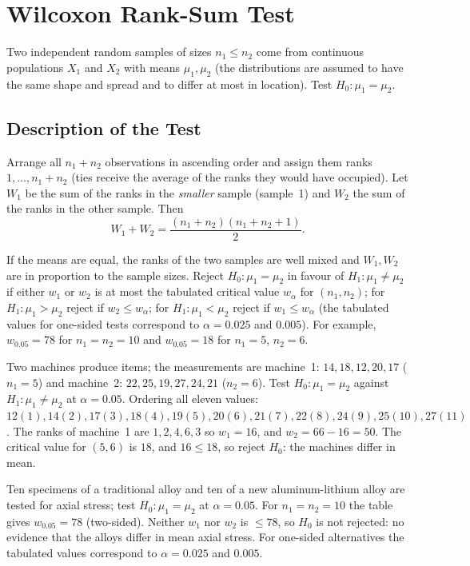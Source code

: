 \section{Wilcoxon Rank-Sum Test}

Two independent random samples of sizes $n_1\le n_2$ come from continuous populations $X_1$ and $X_2$ with means $\mu_1,\mu_2$ (the distributions are assumed to have the same shape and spread and to differ at most in location). Test $H_0:\mu_1=\mu_2$.

\subsection{Description of the Test}

\begin{definition}
Arrange all $n_1+n_2$ observations in ascending order and assign them ranks $1,\dots,n_1+n_2$ (ties receive the average of the ranks they would have occupied). Let $W_1$ be the sum of the ranks in the \emph{smaller} sample (sample~1) and $W_2$ the sum of the ranks in the other sample. Then
\[ W_1+W_2=\frac{(n_1+n_2)(n_1+n_2+1)}2. \]
\end{definition}

If the means are equal, the ranks of the two samples are well mixed and $W_1,W_2$ are in proportion to the sample sizes. Reject $H_0:\mu_1=\mu_2$ in favour of $H_1:\mu_1\ne\mu_2$ if either $w_1$ or $w_2$ is at most the tabulated critical value $w_\alpha$ for $(n_1,n_2)$; for $H_1:\mu_1>\mu_2$ reject if $w_2\le w_\alpha$; for $H_1:\mu_1<\mu_2$ reject if $w_1\le w_\alpha$ (the tabulated values for one-sided tests correspond to $\alpha=0.025$ and $0.005$). For example, $w_{0.05}=78$ for $n_1=n_2=10$ and $w_{0.05}=18$ for $n_1=5$, $n_2=6$.

\begin{example}\label{ex:ranksum}
Two machines produce items; the measurements are machine~1: $14,18,12,20,17$ ($n_1=5$) and machine~2: $22,25,19,27,24,21$ ($n_2=6$). Test $H_0:\mu_1=\mu_2$ against $H_1:\mu_1\ne\mu_2$ at $\alpha=0.05$. Ordering all eleven values: $12(1),14(2),17(3),18(4),19(5),20(6),21(7),22(8),24(9),25(10),27(11)$. The ranks of machine~1 are $1,2,4,6,3$ so $w_1=16$, and $w_2=66-16=50$. The critical value for $(5,6)$ is $18$, and $16\le18$, so reject $H_0$: the machines differ in mean.
\end{example}

\begin{example}
Ten specimens of a traditional alloy and ten of a new aluminum-lithium alloy are tested for axial stress; test $H_0:\mu_1=\mu_2$ at $\alpha=0.05$. For $n_1=n_2=10$ the table gives $w_{0.05}=78$ (two-sided). Neither $w_1$ nor $w_2$ is $\le78$, so $H_0$ is not rejected: no evidence that the alloys differ in mean axial stress. For one-sided alternatives the tabulated values correspond to $\alpha=0.025$ and $0.005$.
\end{example}

